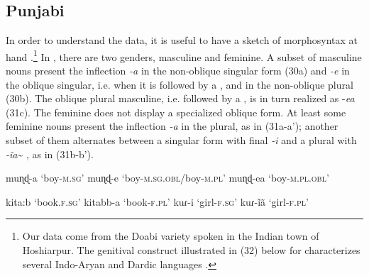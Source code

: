 \documentclass[output=paper]{langsci/langscibook}
\begin{document}
\subsection{Punjabi}%
In order to understand the  data, it is useful to have a sketch of  morphosyntax at hand \citep{Bhatia2000}.\footnote{{Our  data come} from the Doabi variety spoken in the Indian town of Hoshiarpur. {The genitival construct illustrated in (32) below for  characterizes several Indo-Aryan and Dardic languages \citep{Payne1995}.} }{} In , there are two genders, masculine and feminine. A subset of masculine nouns present the inflection \textit{{}-a} in the non-oblique singular form (30a) and \textit{{}-e} in the oblique singular, i.e. when it is followed by a , and in the non-oblique plural (30b). The oblique plural masculine, i.e. followed by a , is in turn realized as -\textit{ea} (31c). The feminine does not display a specialized oblique form. At least some feminine nouns present the inflection \textit{{}-a} in the plural, as in (31a-a’); another subset of them alternates between a singular form with final \textit{{}-i} and a plural with \textit{{}-ĩa}\~{} , as in (31b-b’). 

\ea%
    \label{ex:manzini:30}
    \ea muɳɖ-a
        \glt ‘boy-\textsc{m.sg}’
    \ex muɳɖ-e
        \glt ‘boy-\textsc{m.sg.obl}/boy-\textsc{m.pl}’  
    \ex muɳɖ-ea
        \glt ‘boy-\textsc{m.pl.obl}’
\z
\z

\ea%
    \label{ex:manzini:31}
        \begin{xlista}
        \ex  kita:b        
        \glt ‘book.\textsc{f.sg}’
         kitabb-a      
        \glt      ‘book-\textsc{f.pl}’ 
        \ex   kuɾ-i         
        \glt  ‘girl-\textsc{f.sg}’
          kuɾ-ĩã         
        \glt      ‘girl-\textsc{f.pl}’
        \end{xlista}
\z
\end{document}
